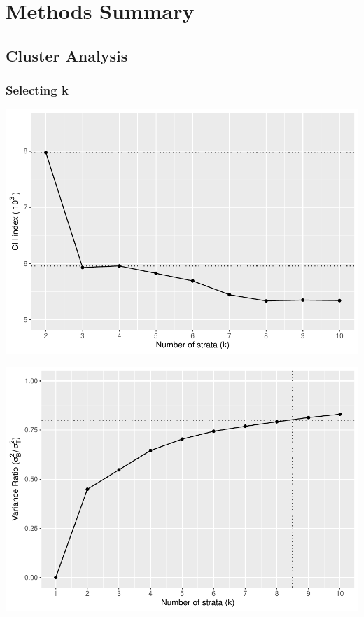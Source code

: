 \documentclass[
  english,
  man,floatsintext]{apa6}
\begin{document}
\hypertarget{methods-summary}{%
\section{Methods Summary}\label{methods-summary}}

\hypertarget{cluster-analysis}{%
\subsection{Cluster Analysis}\label{cluster-analysis}}

\hypertarget{selecting-k}{%
\subsubsection{Selecting k}\label{selecting-k}}

\includegraphics{5---Analysis_files/figure-latex/unnamed-chunk-4-1.pdf}

\includegraphics{5---Analysis_files/figure-latex/unnamed-chunk-5-1.pdf}
\end{document}
